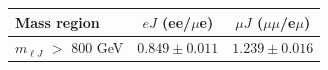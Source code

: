 \begin{table}[htp]
  \label{tab:emu_tf_boosted_perchannel_RunIII2024Summer24}
  \centering
  \begin{tabular}{l | c c}
    \hline
    Mass region & $eJ$ (ee/$\mu$e) & $\mu J$ ($\mu\mu$/e$\mu$) \\
    \hline
    $m_{\ell J}$ $>$ 800 GeV & $0.849 \pm 0.011$ & $1.239 \pm 0.016$ \\
    \hline
  \end{tabular}
\end{table}
